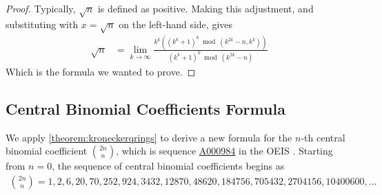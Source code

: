 \documentclass[11pt,reqno]{article}
\theoremstyle{plain}
\theoremstyle{definition}
\newcommand{\seqnum}[1]{\href{https://oeis.org/#1}{\rm \underline{#1}}}
\begin{document}
\begin{proof}
Typically, $\sqrt{n}$ is defined as positive. Making this adjustment, and substituting with $x = \sqrt{n}$ on the left-hand side, gives
\begin{align*}
\sqrt{n} &= \lim_{k\rightarrow\infty}
    \frac{k^k ((k^k + 1)^k \bmod{(k^{2k}-n, k^k)})}
        {(k^k + 1)^k \bmod{(k^{2k}-n)}}
\end{align*}
Which is the formula we wanted to prove.
\end{proof}

\subsection{Central Binomial Coefficients Formula}
We apply \cref{theorem:kroneckerqrings} to derive a new formula for the $n$-th central binomial coefficient $\binom{2n}{n}$, which is sequence \seqnum{A000984} in the OEIS \cite{A000984}. Starting from $n=0$, the sequence of central binomial coefficients begins as
\begin{align*}
    \binom{2n}{n} = 1, 2, 6, 20, 70, 252, 924, 3432, 12870, 48620, 184756, 705432, 2704156, 10400600, \ldots
\end{align*}
\end{document}
